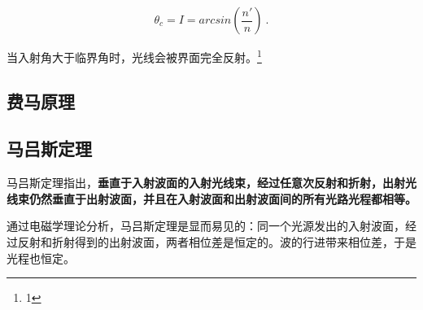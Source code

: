 \begin{equation}
\theta _c=I=arcsin(\frac{n'}{n}) ~.
\end{equation}

当入射角大于临界角时，光线会被界面完全反射。\footnote{1}

\subsection{费马原理}

\subsection{马吕斯定理}

马吕斯定理指出，\textbf{垂直于入射波面的入射光线束，经过任意次反射和折射，出射光线束仍然垂直于出射波面，并且在入射波面和出射波面间的所有光路光程都相等。}

通过电磁学理论分析，马吕斯定理是显而易见的：同一个光源发出的入射波面，经过反射和折射得到的出射波面，两者相位差是恒定的。波的行进带来相位差，于是光程也恒定。
